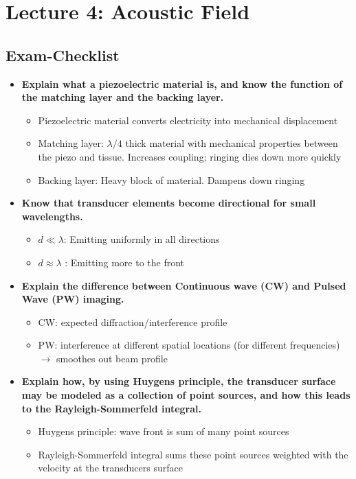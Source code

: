 \documentclass[10pt,a4paper,noendnumber=true]{scrartcl}
\begin{document}
\newpage
\section{Lecture 4: Acoustic Field}

\subsection{Exam-Checklist}
\begin{itemize}
\item \textbf{Explain what a piezoelectric material is, and know the function of the matching layer and the backing layer.}
\begin{itemize}
\item Piezoelectric material converts electricity into mechanical displacement
\item Matching layer: $\lambda/4$ thick material with mechanical properties between the piezo and tissue. Increases coupling; ringing dies down more quickly
\item Backing layer: Heavy block of material. Dampens down ringing
\end{itemize}


\item \textbf{Know that transducer elements become directional for small wavelengths.}
\begin{itemize}
\item $d \ll \lambda$: Emitting uniformly in all directions
\item $d \approx \lambda$ : Emitting more to the front
\end{itemize}

\item \textbf{Explain the difference between Continuous wave (CW) and Pulsed Wave (PW) imaging.}
\begin{itemize}
\item CW: expected diffraction/interference profile
\item PW: interference at different spatial locations (for different frequencies) $\rightarrow$ smoothes out beam profile
\end{itemize}


\item \textbf{Explain how, by using Huygens principle, the transducer surface may be modeled as a collection of point sources, and how this leads to the Rayleigh-Sommerfeld integral.}
\begin{itemize}
\item Huygens principle: wave front is sum of many point sources
\item Rayleigh-Sommerfeld integral sums these point sources weighted with the velocity at the transducers surface
\end{itemize}



\end{itemize}
\end{document}
